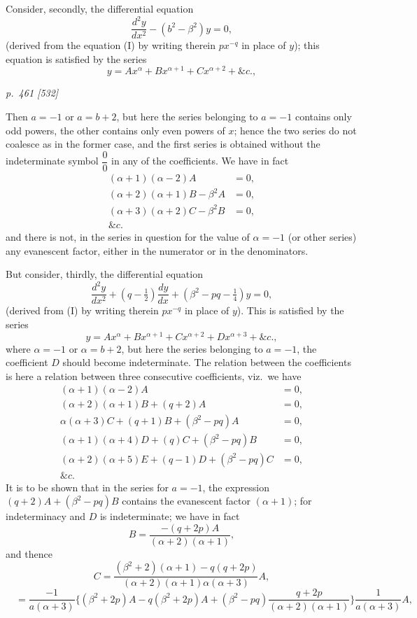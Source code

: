 \documentclass[11pt,a4paper]{book}
\begin{document}
Consider, secondly, the differential equation
\[
\frac{d^2y}{dx^2} - (b^2 - \beta^2)y = 0,\tag{II}
\]
(derived from the equation (I) by writing therein $px^{-q}$ in place of $y$); this equation
is satisfied by the series
\[
y = Ax^\alpha + Bx^{\alpha+1} + Cx^{\alpha+2} + \&c.,
\]

\clearpage

\bigskip
\textit{p.~461 [532]}
\smallskip

Then $a = -1$ or $a = b + 2$, but here the series belonging to $a = -1$ contains only odd
powers, the other contains only even powers of $x$; hence the two series do not
coalesce as in the former case, and the first series is obtained without the indeterminate symbol $\dfrac{0}{0}$ in any of the coefficients. We have in fact
\begin{align*}
(\alpha + 1)(\alpha - 2)A &= 0,\\
(\alpha + 2)(\alpha + 1)B - \beta^2 A &= 0,\\
(\alpha + 3)(\alpha + 2)C - \beta^2 B &= 0,\\
\&c.
\end{align*}
and there is not, in the series in question for the value of $\alpha = -1$ (or other series) any evanescent
factor, either in the numerator or in the denominators.

But consider, thirdly, the differential equation
\[
\frac{d^2y}{dx^2} + (q - \tfrac{1}{2})\frac{dy}{dx} + \left(\beta^2 - pq - \tfrac{1}{4}\right)y = 0\tag{III},
\]
(derived from (I) by writing therein $px^{-q}$ in place of $y$). This is satisfied by the series
\[
y = Ax^\alpha + Bx^{\alpha+1} + Cx^{\alpha+2} + Dx^{\alpha+3} + \&c.,
\]
where $\alpha = -1$ or $\alpha = b + 2$, but here the series belonging to $a = -1$, the coefficient
$D$ should become indeterminate. The relation between the coefficients is here a
relation between three consecutive coefficients, viz.\ we have
\begin{align*}
(\alpha + 1)(\alpha - 2)A &= 0,\\
(\alpha + 2)(\alpha + 1)B + (q + 2)A &= 0,\\
\alpha(\alpha + 3)C + (q + 1)B + (\beta^2 - pq)A &= 0,\\
(\alpha + 1)(\alpha + 4)D + (q)C + (\beta^2 - pq)B &= 0,\\
(\alpha + 2)(\alpha + 5)E + (q - 1)D + (\beta^2 - pq)C &= 0,\\
\&c.
\end{align*}
It is to be shown that in the series for $a = -1$, the expression $(q + 2)A + (\beta^2 - pq)B$
contains the evanescent factor $(\alpha + 1)$; for indeterminacy and $D$ is indeterminate; we
have in fact
\[
B = \frac{-(q + 2p)A}{(\alpha + 2)(\alpha + 1)},
\]
and thence
\[
C = \frac{(\beta^2 + 2)(\alpha + 1) - q(q + 2p)}{(\alpha + 2)(\alpha + 1)\alpha(\alpha + 3)}A,
\]
\[
\quad = \dfrac{-1}{a(\alpha + 3)}\Big\{(\beta^2 + 2p)A - q(\beta^2 + 2p)A + (\beta^2 - pq) \dfrac{q + 2p}{(\alpha + 2)(\alpha + 1)}\Big\}\dfrac{1}{a(\alpha + 3)}A,
\]
\end{document}
